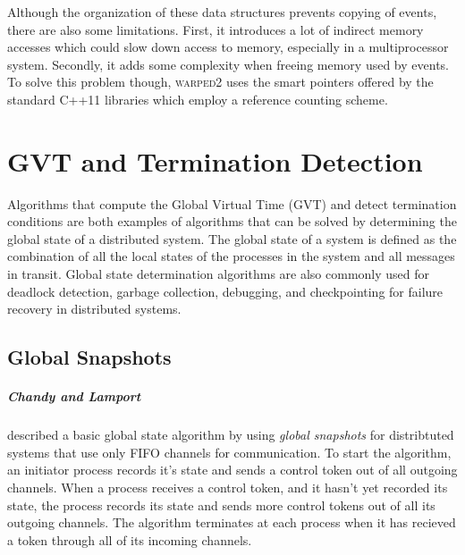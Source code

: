 \documentclass[11pt]{book}
\begin{document}
Although the organization of these data structures prevents copying of events, there are also
some limitations.  First, it introduces a lot of indirect memory accesses which could slow down
access to memory, especially in a multiprocessor system.  Secondly, it adds some complexity
when freeing memory used by events.  To solve this problem though, \textsc{warped2} uses the
smart pointers offered by the standard C++11 libraries which employ a reference counting
scheme.



\chapter{GVT and Termination Detection}\label{gvt_termination}

Algorithms that compute the Global Virtual Time (GVT) and detect termination conditions are
both examples of algorithms that can be solved by determining the global state of a
distributed system.  The global state of a system is defined as the combination of all
the local states of the processes in the system and all messages in transit.  Global state
determination algorithms are also commonly used for deadlock detection, garbage collection,
debugging, and checkpointing for failure recovery in distributed systems.

\section{Global Snapshots}

\paragraph{Chandy and Lamport}\cite{chandy-85} described a basic global state algorithm by
using \emph{global snapshots} for distribtuted systems that use only FIFO channels for
communication.  To start the algorithm, an initiator process records it's state and sends
a control token out of all outgoing channels.  When a process receives a control token, and
it hasn't yet recorded its state, the process records its state and sends more control
tokens out of all its outgoing channels.  The algorithm terminates at each process when it
has recieved a token through all of its incoming channels.
\end{document}
